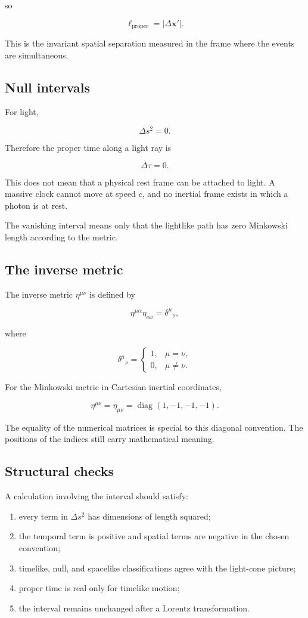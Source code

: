 so

\[
\ell_{\mathrm{proper}}
=
|\Delta\mathbf{x}'|.
\]

This is the invariant spatial separation measured in the frame where the events are simultaneous.

\subsection{Null intervals}

For light,

\[
\Delta s^{2}=0.
\]

Therefore the proper time along a light ray is

\[
\Delta\tau=0.
\]

This does not mean that a physical rest frame can be attached to light. A massive clock cannot move at speed \(c\), and no inertial frame exists in which a photon is at rest.

The vanishing interval means only that the lightlike path has zero Minkowski length according to the metric.

\subsection{The inverse metric}

The inverse metric \(\eta^{\mu\nu}\) is defined by

\[
\eta^{\mu\alpha}\eta_{\alpha\nu}
=
\delta^{\mu}{}_{\nu},
\]

where

\[
\delta^{\mu}{}_{\nu}
=
\begin{cases}
1,&\mu=\nu,\\
0,&\mu\neq\nu.
\end{cases}
\]

For the Minkowski metric in Cartesian inertial coordinates,

\[
\boxed{
\eta^{\mu\nu}
=
\eta_{\mu\nu}
=
\operatorname{diag}(1,-1,-1,-1)
}.
\]

The equality of the numerical matrices is special to this diagonal convention. The positions of the indices still carry mathematical meaning.

\subsection{Structural checks}

A calculation involving the interval should satisfy:

\begin{enumerate}
    \item every term in \(\Delta s^{2}\) has dimensions of length squared;
    \item the temporal term is positive and spatial terms are negative in the chosen convention;
    \item timelike, null, and spacelike classifications agree with the light-cone picture;
    \item proper time is real only for timelike motion;
    \item the interval remains unchanged after a Lorentz transformation.
\end{enumerate}

